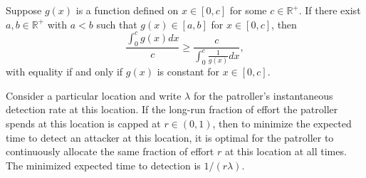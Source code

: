 \documentclass[10pt,a4paper]{amsart}
\begin{document}
\begin{lem}
\label{lem: am>=hm}
Suppose $g(x)$ is a function defined on $x \in [0,c]$ for some $c \in \mathbb{R}^+$.
If there exist $a,b \in \mathbb{R}^+$ with $a < b$ such that $g(x) \in [a,b]$ for $x \in [0,c]$, then
\[
\frac{\int_0^c g(x) dx }{c} \geq \frac{c}{\int_0^c \frac{1}{g(x)} dx},
\]
with equality if and only if $g(x)$ is constant for $x \in [0,c]$.
\end{lem}

\begin{theorem}
\label{th:one_location}
Consider a particular location and write $\lambda$ for the patroller's instantaneous detection rate at this location.
If the long-run fraction of effort the patroller spends at this location is capped at $r \in (0,1)$, then to minimize the expected time to detect an attacker at this location, it is optimal for the patroller to continuously allocate the same fraction of effort $r$ at this location at all times.
The minimized expected time to detection is $1 / (r \lambda)$.
\end{theorem}
\end{document}
